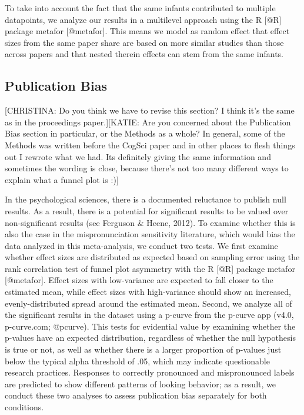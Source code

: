 \documentclass[man]{apa6}
\theoremstyle{definition}
\theoremstyle{definition}
\theoremstyle{definition}
\theoremstyle{remark}
\begin{document}
To take into account the fact that the same infants contributed to
multiple datapoints, we analyze our results in a multilevel approach
using the R {[}@R{]} package metafor {[}@metafor{]}. This means we model
as random effect that effect sizes from the same paper share are based
on more similar studies than those across papers and that nested therein
effects can stem from the same infants.

\subsection{Publication Bias}\label{publication-bias}

{[}CHRISTINA: Do you think we have to revise this section? I think it's
the same as in the proceedings paper.{]}{[}KATIE: Are you concerned
about the Publication Bias section in particular, or the Methods as a
whole? In general, some of the Methods was written before the CogSci
paper and in other places to flesh things out I rewrote what we had. Its
definitely giving the same information and sometimes the wording is
close, because there's not too many different ways to explain what a
funnel plot is :){]}

In the psychological sciences, there is a documented reluctance to
publish null results. As a result, there is a potential for significant
results to be valued over non-significant results (see Ferguson \&
Heene, 2012). To examine whether this is also the case in the
mispronunciation sensitivity literature, which would bias the data
analyzed in this meta-analysis, we conduct two tests. We first examine
whether effect sizes are distributed as expected based on sampling error
using the rank correlation test of funnel plot asymmetry with the R
{[}@R{]} package metafor {[}@metafor{]}. Effect sizes with low-variance
are expected to fall closer to the estimated mean, while effect sizes
with high-variance should show an increased, evenly-distributed spread
around the estimated mean. Second, we analyze all of the significant
results in the dataset using a p-curve from the p-curve app (v4.0,
p-curve.com; @pcurve). This tests for evidential value by examining
whether the p-values have an expected distribution, regardless of
whether the null hypothesis is true or not, as well as whether there is
a larger proportion of p-values just below the typical alpha threshold
of .05, which may indicate questionable research practices. Responses to
correctly pronounced and mispronounced labels are predicted to show
different patterns of looking behavior; as a result, we conduct these
two analyses to assess publication bias separately for both conditions.
\end{document}
